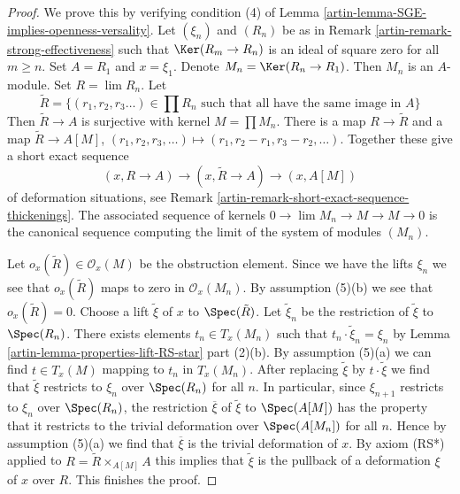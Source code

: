 \begin{proof}

We prove this by verifying condition (4) of
Lemma \ref{artin-lemma-SGE-implies-openness-versality}.
Let $(\xi_n)$ and $(R_n)$ be as in Remark \ref{artin-remark-strong-effectiveness}
such that $\Ker(R_m \to R_n)$ is an ideal of square zero
for all $m \geq n$. Set $A = R_1$ and $x = \xi_1$.
Denote $M_n = \Ker(R_n \to R_1)$.
Then $M_n$ is an $A$-module. Set $R = \lim R_n$.
Let
$$
\tilde R = \{(r_1, r_2, r_3 \ldots) \in \prod R_n
\text{ such that all have the same image in }A\}
$$
Then $\tilde R \to A$ is surjective with kernel $M = \prod M_n$.
There is a map $R \to \tilde R$ and a map
$\tilde R \to A[M]$, $(r_1, r_2, r_3, \ldots) \mapsto
(r_1, r_2 - r_1, r_3 - r_2, \ldots)$.
Together these give a short exact sequence
$$
(x, R \to A) \to (x, \tilde R \to A) \to (x, A[M])
$$
of deformation situations, see
Remark \ref{artin-remark-short-exact-sequence-thickenings}.
The associated sequence of kernels
$0 \to \lim M_n \to M \to M \to 0$
is the canonical sequence computing the limit
of the system of modules $(M_n)$.

\medskip\noindent
Let $o_x(\tilde R) \in \mathcal{O}_x(M)$ be the obstruction element.
Since we have the lifts $\xi_n$ we see that $o_x(\tilde R)$
maps to zero in $\mathcal{O}_x(M_n)$. By assumption (5)(b)
we see that $o_x(\tilde R) = 0$. Choose a lift $\tilde \xi$
of $x$ to $\Spec(\tilde R)$. Let $\tilde \xi_n$ be the
restriction of $\tilde \xi$ to $\Spec(R_n)$. There exists
elements $t_n \in T_x(M_n)$ such that
$t_n \cdot \tilde \xi_n = \xi_n$ by
Lemma \ref{artin-lemma-properties-lift-RS-star} part (2)(b).
By assumption (5)(a) we can find $t \in T_x(M)$
mapping to $t_n$ in $T_x(M_n)$. After replacing
$\tilde \xi$ by $t \cdot \tilde \xi$ we find that
$\tilde \xi$ restricts to $\xi_n$ over $\Spec(R_n)$ for all $n$.
In particular, since $\xi_{n + 1}$ restricts to $\xi_n$
over $\Spec(R_n)$, the restriction $\overline{\xi}$ of $\tilde \xi$
to $\Spec(A[M])$ has the property that it restricts to
the trivial deformation over $\Spec(A[M_n])$ for all $n$.
Hence by assumption (5)(a) we find that $\overline{\xi}$
is the trivial deformation of $x$. By axiom (RS*)
applied to $R = \tilde R \times_{A[M]} A$
this implies that $\tilde \xi$ is the pullback
of a deformation $\xi$ of $x$ over $R$. This finishes the proof.
\end{proof}

